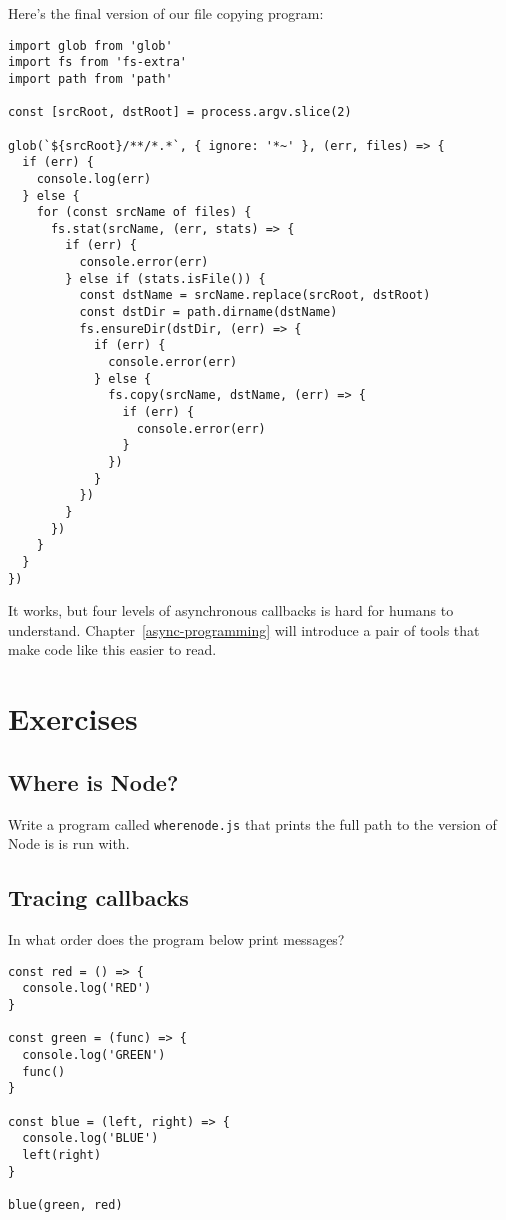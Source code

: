 \documentclass[krantzl]{krantz}
\newcommand{\chapref}[1]{Chapter~\ref{#1}}
\begin{document}
Here's the final version of our file copying program:


\begin{lstlisting}[frame=single,frameround=tttt]
import glob from 'glob'
import fs from 'fs-extra'
import path from 'path'

const [srcRoot, dstRoot] = process.argv.slice(2)

glob(`${srcRoot}/**/*.*`, { ignore: '*~' }, (err, files) => {
  if (err) {
    console.log(err)
  } else {
    for (const srcName of files) {
      fs.stat(srcName, (err, stats) => {
        if (err) {
          console.error(err)
        } else if (stats.isFile()) {
          const dstName = srcName.replace(srcRoot, dstRoot)
          const dstDir = path.dirname(dstName)
          fs.ensureDir(dstDir, (err) => {
            if (err) {
              console.error(err)
            } else {
              fs.copy(srcName, dstName, (err) => {
                if (err) {
                  console.error(err)
                }
              })
            }
          })
        }
      })
    }
  }
})
\end{lstlisting}



\noindent It works,
but four levels of asynchronous callbacks is hard for humans to understand.
\chapref{async-programming} will introduce a pair of tools
that make code like this easier to read.


\section{Exercises}\label{systems-programming-exercises}

\subsection*{Where is Node?}


Write a program called \texttt{wherenode.js} that prints the full path to the version of Node is is run with.

\subsection*{Tracing callbacks}


In what order does the program below print messages?


\begin{lstlisting}[frame=single,frameround=tttt]
const red = () => {
  console.log('RED')
}

const green = (func) => {
  console.log('GREEN')
  func()
}

const blue = (left, right) => {
  console.log('BLUE')
  left(right)
}

blue(green, red)
\end{lstlisting}
\end{document}
